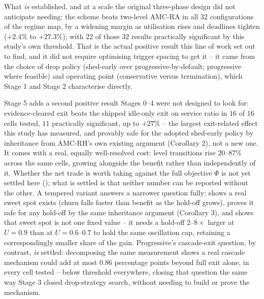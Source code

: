 What \emph{is} established, and at a scale the original three-phase design did
not anticipate needing: the scheme beats two-level AMC-RA in all $32$
configurations of the regime map, by a widening margin as utilisation rises
and deadlines tighten ($+2.4\%$ to $+27.3\%$), with $22$ of those $32$ results
practically significant by this study's own threshold. That is the actual
positive result this line of work set out to find, and it did not require
optimising trigger spacing to get it -- it came from the choice of drop policy
(shed-early over progressive-by-default; progressive where feasible) and
operating point (conservative versus termination), which Stage 1 and Stage 2
characterise directly.

Stage 5 adds a second positive result Stages 0--4 were not designed to look
for: evidence-cleared exit beats the shipped idle-only exit on service ratio
in $16$ of $16$ cells tested, $11$ practically significant, up to
$+27\%$ -- the largest exit-related effect this study has measured, and
provably safe for the adopted shed-early policy by inheritance from AMC-RH's
own existing argument (Corollary 2), not a new one. It comes with a real,
equally well-resolved cost: level transitions rise $20$--$87\%$ across the same
cells, growing alongside the benefit rather than independently of it. Whether
the net trade is worth taking against the full objective $\Phi$ is not yet
settled here (); what is settled is that neither number
can be reported without the other. A tempered variant answers a narrower
question fully:  shows a real sweet spot exists (churn
falls faster than benefit as the hold-off grows), proves it safe for any
hold-off by the same inheritance argument (Corollary 3), and shows that sweet
spot is not one fixed value -- it needs a hold-off $2$--$8\times$ larger at
$U=0.9$ than at $U=0.6$--$0.7$ to hold the same oscillation cap, retaining a
correspondingly smaller share of the gain. Progressive's cascade-exit
question, by
contrast, \emph{is} settled: decomposing the same measurement shows a real
cascade mechanism could add at most $0.86$ percentage points beyond full exit
alone, in every cell tested -- below threshold everywhere, closing that
question the same way Stage 3 closed drop-strategy search, without needing to
build or prove the mechanism.


